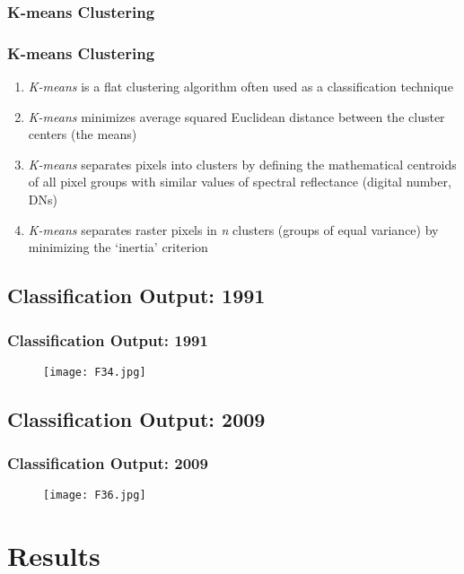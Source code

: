 \documentclass[pdflatex,compress,8pt,
	xcolor={dvipsnames,dvipsnames,svgnames,x11names,table},
	hyperref={
	breaklinks = true, 
	pdfauthor={Lemenkova Polina}, 
	pdfsubject={Preentation}, 
	pdfcreator={Lemenkova Polina}, 
	pdfproducer={Lemenkova Polina}, 
	colorlinks=true,linkcolor=blue, 
	citecolor=NavyBlue, 
	urlcolor = NavyBlue, 
	breaklinks = true}]{beamer}
\begin{document}
\subsubsection{K-means Clustering}
\begin{frame}\frametitle{K-means Clustering}
\begin{enumerate}
	\item \emph{K-means} is a flat clustering algorithm often used as a classification technique
	\item \emph{K-means} minimizes average squared Euclidean distance between the cluster centers (the means)
	\item \emph{K-means} separates pixels into clusters by defining the mathematical centroids of all pixel groups with similar values of spectral reflectance (digital number, DNs)
	\item \emph{K-means} separates raster pixels in \emph{n} clusters (groups of equal variance) by minimizing the ‘inertia’ criterion
\end{enumerate}
\begin{figure}[H]
	\centering
			\hspace{5mm}
\end{figure}
\end{frame}

\subsection{Classification Output: 1991}
\begin{frame}\frametitle{Classification Output: 1991}
\begin{figure}[H]
	\centering
		\texttt{[image: F34.jpg]}
\end{figure}
\end{frame}

\subsection{Classification Output: 2009}
\begin{frame}\frametitle{Classification Output: 2009}
\begin{figure}[H]
	\centering
		\texttt{[image: F36.jpg]}
\end{figure}
\end{frame}

\section{Results}
\end{document}

